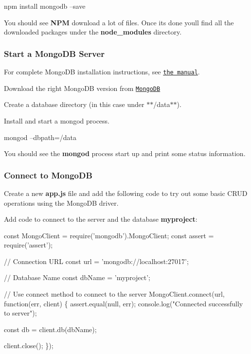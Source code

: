 \begin{DoxyCode}
npm install mongodb --save
\end{DoxyCode}


You should see {\bfseries N\+PM} download a lot of files. Once it\textquotesingle{}s done you\textquotesingle{}ll find all the downloaded packages under the {\bfseries node\+\_\+modules} directory.

\subsubsection*{Start a Mongo\+DB Server}

For complete Mongo\+DB installation instructions, see \href{https://docs.mongodb.org/manual/installation/}{\tt the manual}.


\begin{DoxyEnumerate}
\item Download the right Mongo\+DB version from \href{https://www.mongodb.org/downloads}{\tt Mongo\+DB}
\item Create a database directory (in this case under $\ast$$\ast$/data$\ast$$\ast$).
\item Install and start a {\ttfamily mongod} process.
\end{DoxyEnumerate}


\begin{DoxyCode}
mongod --dbpath=/data
\end{DoxyCode}


You should see the {\bfseries mongod} process start up and print some status information.

\subsubsection*{Connect to Mongo\+DB}

Create a new {\bfseries app.\+js} file and add the following code to try out some basic C\+R\+UD operations using the Mongo\+DB driver.

Add code to connect to the server and the database {\bfseries myproject}\+:


\begin{DoxyCode}
const MongoClient = require('mongodb').MongoClient;
const assert = require('assert');

// Connection URL
const url = 'mongodb://localhost:27017';

// Database Name
const dbName = 'myproject';

// Use connect method to connect to the server
MongoClient.connect(url, function(err, client) \{
  assert.equal(null, err);
  console.log("Connected successfully to server");

  const db = client.db(dbName);

  client.close();
\});
\end{DoxyCode}


